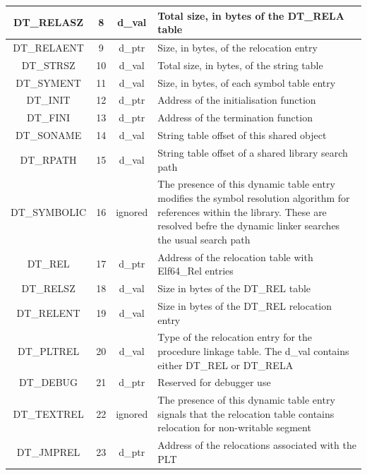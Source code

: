 \documentclass[paper=a4, fontsize=11pt]{report} %
\numberwithin{equation}{section} %
\numberwithin{figure}{section} %
\numberwithin{table}{section} %
\begin{document}
\begin{itemize}
\begin{table}[!htbp]
\begin{center}
\begin{tabular}{|c|c|c|p{10cm}|}
{\ttfamily DT\_RELASZ} & 8 & {\ttfamily d\_val} & Total size, in bytes of the 
{\ttfamily DT\_RELA} table\\ \hline
{\ttfamily DT\_RELAENT} & 9 & {\ttfamily d\_ptr} & Size, in bytes, of the 
relocation entry\\ \hline
{\ttfamily DT\_STRSZ} & 10 & {\ttfamily d\_val} & Total size, in bytes, of the 
string table\\ \hline
{\ttfamily DT\_SYMENT} & 11 & {\ttfamily d\_val} & Size, in bytes, of each 
symbol table entry\\ \hline
{\ttfamily DT\_INIT} & 12 & {\ttfamily d\_ptr} & Address of the initialisation 
function\\ \hline
{\ttfamily DT\_FINI} & 13 & {\ttfamily d\_ptr} & Address of the termination 
function\\ \hline
{\ttfamily DT\_SONAME} & 14 & {\ttfamily d\_val} & String table offset of this 
shared object\\ \hline
{\ttfamily DT\_RPATH} & 15 & {\ttfamily d\_val} & String table offset of a 
shared library search path\\ \hline
{\ttfamily DT\_SYMBOLIC} & 16 & {\ttfamily ignored} & The presence of this 
dynamic table entry modifies the symbol resolution algorithm for references 
within the library. These are resolved befre the dynamic linker searches the 
usual search path\\ \hline
{\ttfamily DT\_REL} & 17 & {\ttfamily d\_ptr} & Address of the relocation table 
with {\ttfamily Elf64\_Rel} entries\\ \hline
{\ttfamily DT\_RELSZ} & 18 & {\ttfamily d\_val} & Size in bytes of the 
{\ttfamily DT\_REL} table\\ \hline
{\ttfamily DT\_RELENT} & 19 & {\ttfamily d\_val} & Size in bytes of the 
{\ttfamily DT\_REL} relocation entry\\ \hline
{\ttfamily DT\_PLTREL} & 20 & {\ttfamily d\_val} & Type of the relocation entry 
for the procedure linkage table. The {\ttfamily d\_val} contains either 
{\ttfamily DT\_REL} or {\ttfamily DT\_RELA}\\ \hline
{\ttfamily DT\_DEBUG} & 21 & {\ttfamily d\_ptr} & Reserved for debugger use\\ 
\hline
{\ttfamily DT\_TEXTREL} & 22 & {\ttfamily ignored} & The presence of this 
dynamic table entry signals that the relocation table contains relocation for 
non-writable segment\\ \hline
{\ttfamily DT\_JMPREL} & 23 & {\ttfamily d\_ptr} & Address of the relocations 
associated with the {\ttfamily PLT}\\ \hline

\end{tabular}
\end{center}
\end{table}
\end{itemize}
\end{document}

